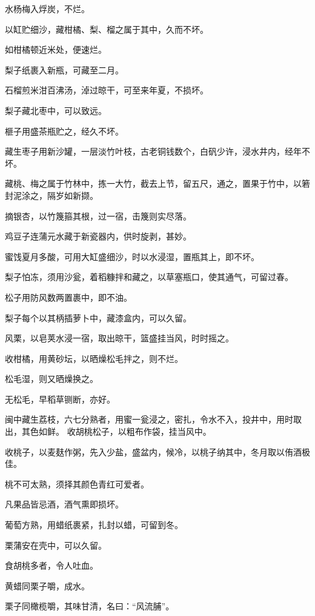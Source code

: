 \documentclass[a4paper,12pt,UTF8,twoside]{ctexbook}
\begin{document}
    水杨梅入烰炭，不烂。
    
    以缸贮细沙，藏柑橘、梨、榴之属于其中，久而不坏。
    
    如柑橘顿近米处，便速烂。
    
    梨子纸裹入新瓶，可藏至二月。
    
    石榴煎米泔百沸汤，淖过晾干，可至来年夏，不损坏。
    
    梨子藏北枣中，可以致远。
    
    榧子用盛茶瓶贮之，经久不坏。
    
    藏生枣子用新沙罐，一层淡竹叶枝，古老铜钱数个，白矾少许，浸水井内，经年不坏。
    
    藏桃、梅之属于竹林中，拣一大竹，截去上节，留五尺，通之，置果于竹中，以箬封泥涂之，隔岁如新撷。
    
    摘银杏，以竹篾箍其根，过一宿，击篾则实尽落。
    
    鸡豆子连蒲元水藏于新瓷器内，供时旋剥，甚妙。
    
    蜜饯夏月多酸，可用大缸盛细沙，时以水浸湿，置瓶其上，即不坏。
    
    梨子怕冻，须用沙瓮，着稻糠拌和藏之，以草塞瓶口，使其通气，可留过春。
    
    松子用防风数两置裹中，即不油。
    
    梨子每个以其柄插萝卜中，藏漆盒内，可以久留。
    
    风栗，以皂荚水浸一宿，取出晾干，篮盛挂当风，时时摇之。
    
    收柑橘，用黄砂坛，以晒燥松毛拌之，则不烂。
    
    松毛湿，则又晒燥换之。
    
    无松毛，早稻草铡断，亦好。
    
    闽中藏生荔枝，六七分熟者，用蜜一瓮浸之，密扎，令水不入，投井中，用时取出，其色如鲜。 收胡桃松子，以粗布作袋，挂当风中。
    
    收桃子，以麦麸作粥，先入少盐，盛盆内，候冷，以桃子纳其中，冬月取以侑酒极佳。
    
    桃不可太熟，须择其颜色青红可爱者。
    
    凡果品皆忌酒，酒气熏即损坏。
    
    葡萄方熟，用蜡纸裹紧，扎封以蜡，可留到冬。
    
    栗蒲安在壳中，可以久留。
    
    食胡桃多者，令人吐血。
    
    黄蜡同栗子嚼，成水。
    
    栗子同橄榄嚼，其味甘清，名曰：“风流脯”。
    
\end{document}
